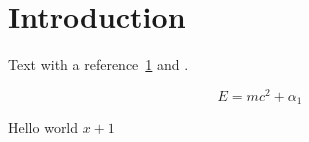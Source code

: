\documentclass[11pt]{article}
\newcommand{\greet}[1]{Hello #1}
\begin{document}
\section{Introduction}
\label{sec:intro}
Text with a reference~\ref{sec:intro} and \cite{knuth}.

\begin{equation}
  E = mc^2 + \alpha_{1}
\end{equation}

\greet{world} $x + 1$
\end{document}
